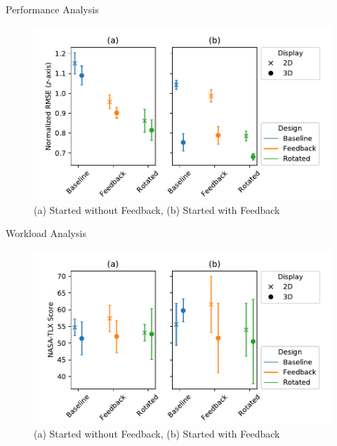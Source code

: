 \documentclass[10pt]{beamer}
\begin{document}
\begin{frame}[fragile]{Performance Analysis}
\begin{figure}
  \begin{center}
    \includegraphics[width=\linewidth]{../img/2way.pdf}\\
    (a) Started without Feedback, (b) Started with Feedback
  \end{center}
\end{figure}
\end{frame}

\begin{frame}[fragile]{Workload Analysis}
\begin{figure}
  \begin{center}
    \includegraphics[width=\linewidth]{../img/2way-work.pdf}\\
    (a) Started without Feedback, (b) Started with Feedback
  \end{center}
\end{figure}
\end{frame}
\end{document}
